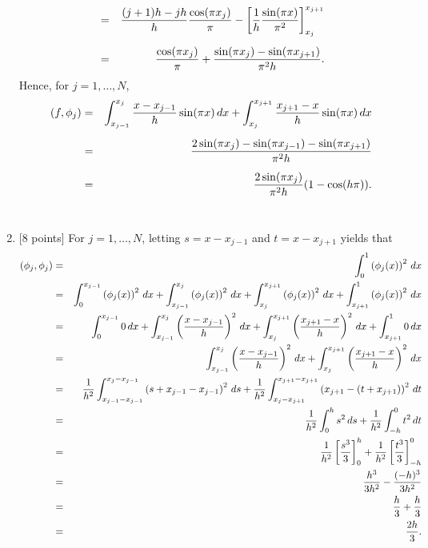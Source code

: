 \begin{solution}
\begin{enumerate}
\begin{eqnarray*}
&=&{(j+1)h-jh \over h}{\cos(\pi x_j) \over \pi}-\left[{1 \over h}{\sin(\pi x) \over \pi^2}\right]_{x_j}^{x_{j+1}}\\[0.5em]
&=&{\cos(\pi x_j) \over \pi}+{\sin(\pi x_j)-\sin(\pi x_{j+1}) \over \pi^2h}.
         \end{eqnarray*} 
Hence, for $j=1,\ldots,N$,
          \begin{eqnarray*}
              (f,\phi_j) &=& \int_{x_{j-1}}^{x_j} {x-x_{j-1} \over h} \sin(\pi x)\, dx
                              + \int_{x_j}^{x_{j+1}} {x_{j+1}-x \over h} \sin(\pi x)\, dx \\[0.5em]
                             &=& {2 \sin(\pi x_j) - \sin(\pi x_{j-1}) - \sin(\pi x_{j+1}) 
                                   \over \pi^2 h} \\[0.5em]
                             &=& {2\sin(\pi x_j) \over \pi^2 h} (1 - \cos(h\pi)).
         \end{eqnarray*} 
\\
\item {[8 points]} For $j=1,\ldots,N$, letting $s=x-x_{j-1}$ and $t=x-x_{j+1}$ yields that
\begin{eqnarray*}
(\phi_j, \phi_j) &=& \int_0^1\left(\phi_j(x)\right)^2\, dx
\\
&=& \int_0^{x_{j-1}}\left(\phi_j(x)\right)^2\, dx+\int_{x_{j-1}}^{x_j}\left(\phi_j(x)\right)^2\, dx+\int_{x_j}^{x_{j+1}}\left(\phi_j(x)\right)^2\, dx+\int_{x_{j+1}}^1\left(\phi_j(x)\right)^2\, dx
\\
&=& \int_0^{x_{j-1}}0\, dx+\int_{x_{j-1}}^{x_j} \left({x-x_{j-1} \over h}\right)^2\, dx + \int_{x_j}^{x_{j+1}} \left({x_{j+1}-x \over h}\right)^2\, dx+\int_{x_{j+1}}^10\, dx
\\
&=& \int_{x_{j-1}}^{x_j} \left({x-x_{j-1} \over h}\right)^2\, dx + \int_{x_j}^{x_{j+1}} \left({x_{j+1}-x \over h}\right)^2\, dx
\\
&=& {1\over h^2}\int_{x_{j-1}-x_{j-1}}^{x_j-x_{j-1}} \left(s+x_{j-1}-x_{j-1}\right)^2\, ds + {1\over h^2}\int_{x_j-x_{j+1}}^{x_{j+1}-x_{j+1}} \left(x_{j+1}-\left(t+x_{j+1}\right)\right)^2\, dt
\\
&=& {1\over h^2}\int_0^h s^2\, ds + {1\over h^2}\int_{-h}^0 t^2\, dt
\\
&=& {1\over h^2}\left[ {s^3 \over 3}\right]_0^h+{1\over h^2}\left[ {t^3 \over 3}\right]_{-h}^0
\\
&=& {h^3 \over 3h^2} - {(-h)^3 \over 3h^2}
\\
&=& {h \over 3} + {h \over 3}
\\
&=& {2h\over 3}.
\end{eqnarray*}


\end{enumerate}
\end{solution}
